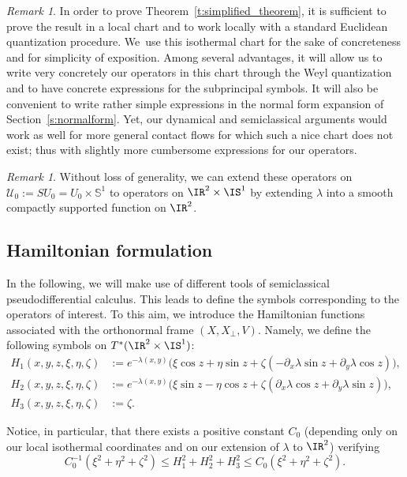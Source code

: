 \documentclass[JEP,XML,SOM,Unicode, NoEqCountersInSection,published]{cedram}
\theoremstyle{plain}
\theoremstyle{definition}
\theoremstyle{remark}
\newtheorem{rema}[theo]{Remark}
\begin{document}
\begin{rema} In order to prove Theorem~\ref{t:simplified_theorem}, it is sufficient to prove the result in a local chart and to work locally with a standard Euclidean quantization procedure. We~use this isothermal chart for the sake of concreteness and for simplicity of exposition. Among several advantages, it will allow us to write very concretely our operators in this chart through the Weyl quantization and to have concrete expressions for the subprincipal symbols. It will also be convenient to write rather simple expressions in the normal form expansion of Section~\ref{s:normalform}. Yet, our dynamical and semiclassical arguments would work as well for more general contact flows for which such a nice chart does not exist; thus with slightly more cumbersome expressions for our operators.
\end{rema}

\begin{rema} Without loss of generality, we can extend these operators on $\mathcal{U}_0:=SU_0=U_0\times\mathbb{S}^1$ to operators on $\IR^2\times\IS^1$ by extending $\lambda$ into a smooth compactly supported function on $\IR^2$.
\end{rema}

\subsection{Hamiltonian formulation}
\label{s:hamiltonian_formalism}

In the following, we will make use of different tools of semiclassical pseudodifferential calculus. This leads to define the symbols corresponding to the operators of interest. To this aim, we introduce the Hamiltonian functions associated with the orthonormal frame $(X,X_\perp, V)$. Namely, we define the following symbols on $T^*(\IR^2\times\IS^1)$:
\begin{align*}
H_1(x,y,z,\xi,\eta,\zeta)&:=e^{-\lambda(x,y)}\bigl(\xi\cos z+\eta\sin z+\zeta(-\partial_x\lambda\sin z +\partial_y\lambda \cos z)\bigr),
\\
H_2(x,y,z,\xi,\eta,\zeta)&:=e^{-\lambda(x,y)}\bigl(\xi\sin z-\eta\cos z+\zeta(\partial_x\lambda\cos z +\partial_y\lambda \sin z)\bigr),\\
\tag*{and}
H_3(x,y,z,\xi,\eta,\zeta)&:=\zeta.
\end{align*}

Notice, in particular, that there exists a positive constant $C_0$ (depending only on our local isothermal coordinates and on our extension of $\lambda$ to $\IR^2$) verifying
\begin{equation}\label{e-norm-comparison}C_0^{-1}(\xi^2+\eta^2+\zeta^2)\leq H_1^2+H_2^2+H_3^2\leq C_0 (\xi^2+\eta^2+\zeta^2).\end{equation}
\end{document}
